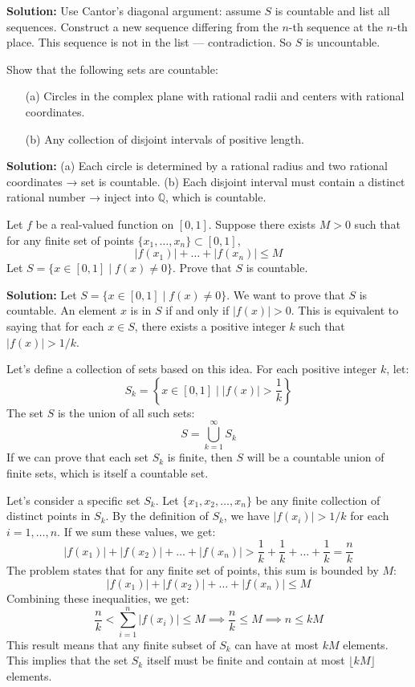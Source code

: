 \textbf{Solution:}  
Use Cantor's diagonal argument: assume \( S \) is countable and list all sequences.  
Construct a new sequence differing from the \( n \)-th sequence at the \( n \)-th place.  
This sequence is not in the list — contradiction. So \( S \) is uncountable.

\begin{problembox}
Show that the following sets are countable:
\begin{itemize}
\item[(a)] Circles in the complex plane with rational radii and centers with rational coordinates.
\item[(b)] Any collection of disjoint intervals of positive length.
\end{itemize}
\end{problembox}

\textbf{Solution:}  
(a) Each circle is determined by a rational radius and two rational coordinates → set is countable.  
(b) Each disjoint interval must contain a distinct rational number → inject into \( \mathbb{Q} \), which is countable.

\begin{problembox}
Let \( f \) be a real-valued function on \( [0,1] \). Suppose there exists \( M > 0 \) such that for any finite set of points \( \{x_1, \dots, x_n\} \subset [0,1] \),  
\[
|f(x_1)| + \dots + |f(x_n)| \le M
\]  
Let \( S = \{x \in [0,1] \mid f(x) \ne 0\} \). Prove that \( S \) is countable.
\end{problembox}

\textbf{Solution:}  
Let $S = \{x \in [0,1] \mid f(x) \ne 0\}$. We want to prove that $S$ is countable.
An element $x$ is in $S$ if and only if $|f(x)| > 0$.
This is equivalent to saying that for each $x \in S$, there exists a positive integer $k$ such that $|f(x)| > 1/k$.

Let's define a collection of sets based on this idea. For each positive integer $k$, let:
\[ S_k = \left\{ x \in [0,1] \mid |f(x)| > \frac{1}{k} \right\} \]
The set $S$ is the union of all such sets:
\[ S = \bigcup_{k=1}^{\infty} S_k \]
If we can prove that each set $S_k$ is finite, then $S$ will be a countable union of finite sets, which is itself a countable set.

Let's consider a specific set $S_k$. Let $\{x_1, x_2, \dots, x_n\}$ be any finite collection of distinct points in $S_k$.
By the definition of $S_k$, we have $|f(x_i)| > 1/k$ for each $i=1, \dots, n$.
If we sum these values, we get:
\[ |f(x_1)| + |f(x_2)| + \dots + |f(x_n)| > \frac{1}{k} + \frac{1}{k} + \dots + \frac{1}{k} = \frac{n}{k} \]
The problem states that for any finite set of points, this sum is bounded by $M$:
\[ |f(x_1)| + |f(x_2)| + \dots + |f(x_n)| \le M \]
Combining these inequalities, we get:
\[ \frac{n}{k} < \sum_{i=1}^n |f(x_i)| \le M \implies \frac{n}{k} \le M \implies n \le kM \]
This result means that any finite subset of $S_k$ can have at most $kM$ elements. This implies that the set $S_k$ itself must be finite and contain at most $\lfloor kM \rfloor$ elements.

